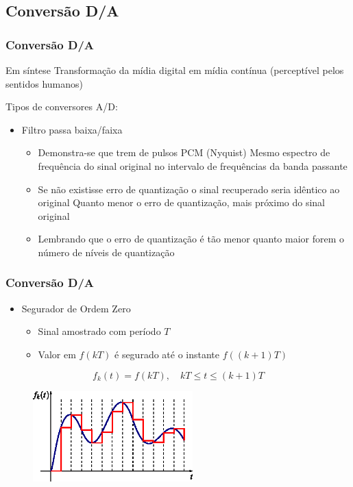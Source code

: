 \documentclass[xcolor]{beamer}
\begin{document}
\subsection{Conversão D/A}
\begin{frame}
    \frametitle{Conversão D/A}

    Em síntese \implica Transformação da mídia digital em mídia contínua
    (perceptível pelos sentidos humanos)

    \vspace{0.25cm}

    Tipos de conversores A/D:

    \begin{itemize}
        \item Filtro passa baixa/faixa
        \begin{itemize}
            \item Demonstra-se que trem de pulsos PCM (Nyquist) \implica Mesmo espectro de
                  frequência do sinal original no intervalo de frequências da
                  banda passante
            \item Se não existisse erro de quantização o sinal recuperado seria
                  idêntico ao original \implica Quanto menor o erro de
                  quantização, mais próximo do sinal original
            \item Lembrando que o erro de quantização é tão menor quanto maior
                  forem o número de níveis de quantização
        \end{itemize}
    \end{itemize}
\end{frame}

\begin{frame}
    \frametitle{Conversão D/A}

    \begin{itemize}
        \item Segurador de Ordem Zero
        \begin{itemize}
            \item Sinal amostrado com período $T$
            \item Valor em $f(kT)$ é segurado até o instante $f\left((k+1)
                  T\right)$
        \end{itemize}
    \end{itemize}

    $$f_k(t) = f(kT), \quad kT \leq t \leq (k+1)T$$

    \begin{figure}[htb]
    \centering
        \includegraphics[width=0.55\textwidth]{imgs/zoh}
    \end{figure}
\end{frame}
\end{document}
